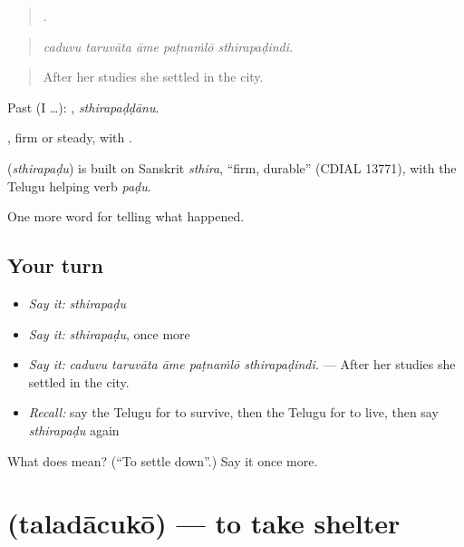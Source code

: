 \begin{quote}
    .
\end{quote}

\begin{quote}
\emph{caduvu taruvāta āme paṭnaṁlō sthirapaḍindi.}
\end{quote}

\begin{quote}
After her studies she settled in the city.
\end{quote}

Past (I …): , \emph{sthirapaḍḍānu}.

, firm or steady, with .

\begin{cousinweb}
\textbf{} (\emph{sthirapaḍu}) is built on Sanskrit \emph{sthira}, \textquotedblleft{}firm, durable\textquotedblright{} (CDIAL 13771), with the Telugu helping verb \emph{paḍu}.
\end{cousinweb}

\begin{grammarlens}[title={What you've built}]
One more word for telling what happened.
\end{grammarlens}

\subsection*{Your turn}
\begin{itemize}
\raggedright
  \item \emph{Say it:} \emph{sthirapaḍu}
  \item \emph{Say it:} \emph{sthirapaḍu}, once more
  \item \emph{Say it:} \emph{caduvu taruvāta āme paṭnaṁlō sthirapaḍindi.} — After her studies she settled in the city.
  \item \emph{Recall:} say the Telugu for to survive, then the Telugu for to live, then say \emph{sthirapaḍu} again
\end{itemize}

\begin{tcolorbox}[breakable,colback=teal!4,colframe=teal!35!black,title={Before you move on}]
What does  mean? (\textquotedblleft{}To settle down\textquotedblright{}.) Say it once more.
\end{tcolorbox}
\section[\texorpdfstring{\te{తలదాచుకో} (taladācukō)}{తలదాచుకో (taladācukō)}]{ (taladācukō) — to take shelter}

